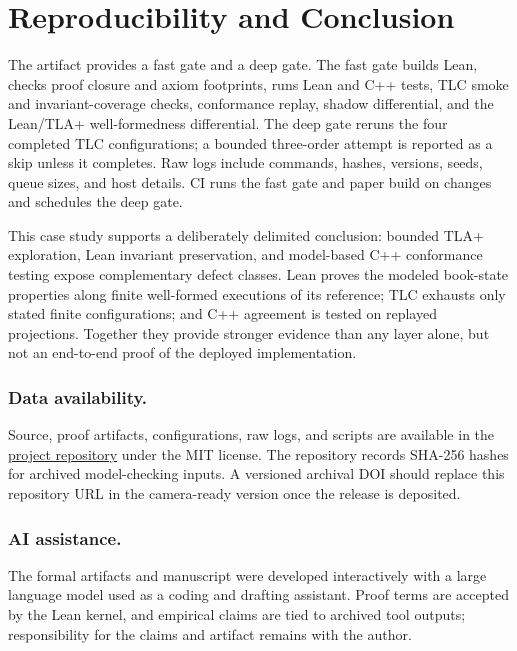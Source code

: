 \documentclass[runningheads]{llncs}
\begin{document}
\section{Reproducibility and Conclusion}

The artifact provides a fast gate and a deep gate. The fast gate builds Lean,
checks proof closure and axiom footprints, runs Lean and C++ tests, TLC smoke
and invariant-coverage checks, conformance replay, shadow differential, and
the Lean/TLA+ well-formedness differential. The deep gate reruns the four
completed TLC configurations; a bounded three-order attempt is reported as a
skip unless it completes. Raw logs include commands, hashes, versions, seeds,
queue sizes, and host details. CI runs the fast gate and paper build on changes
and schedules the deep gate.

This case study supports a deliberately delimited conclusion: bounded TLA+
exploration, Lean invariant preservation, and model-based C++ conformance
testing expose complementary defect classes. Lean proves the modeled
book-state properties along finite well-formed executions of its reference;
TLC exhausts only stated finite configurations; and C++ agreement is tested on
replayed projections. Together they provide stronger evidence than any layer
alone, but not an end-to-end proof of the deployed implementation.

\subsubsection{Data availability.}
Source, proof artifacts, configurations, raw logs, and scripts are available
in the \href{https://github.com/formally-verified-exchange/verified-matching-engine}{project repository}
under the MIT license. The repository records SHA-256 hashes for archived
model-checking inputs. A versioned archival DOI should replace this repository
URL in the camera-ready version once the release is deposited.

\subsubsection{AI assistance.}
The formal artifacts and manuscript were developed interactively with a large
language model used as a coding and drafting assistant. Proof terms are
accepted by the Lean kernel, and empirical claims are tied to archived tool
outputs; responsibility for the claims and artifact remains with the author.
\end{document}
